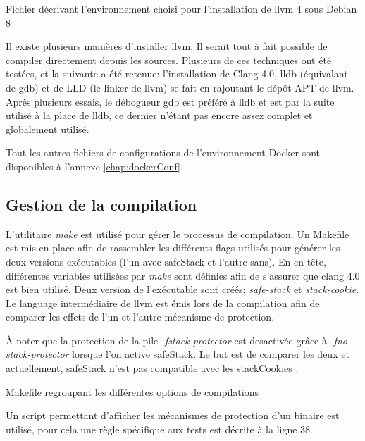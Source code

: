 \begin{listing}
	\caption{Fichier décrivant l'environnement choisi pour l'installation de \gls{llvm} 4 sous Debian 8}
	\label{lst:dockerfile}
\end{listing}

Il existe plusieurs manières d'installer \gls{llvm}. Il serait tout à fait possible de compiler directement depuis les sources. Plusieurs de ces techniques ont été testées, et la suivante a été retenue: l'installation de Clang 4.0, \gls{lldb} (équivalant de \gls{gdb}) et de LLD (le \og linker \fg de \gls{llvm}) se fait en rajoutant le dépôt APT de \gls{llvm}. Après plusieurs essais, le débogueur \gls{gdb} est préféré à \gls{lldb} et est par la suite utilisé à la place de \gls{lldb}, ce dernier n'étant pas encore assez complet et globalement utilisé.

Tout les autres fichiers de configurations de l'environnement Docker sont disponibles à l'annexe \ref{chap:dockerConf}.

\subsection{Gestion de la compilation}

L'utilitaire \textit{make} est utilisé pour gérer le processus de compilation. Un Makefile est mis en place afin de rassembler les différents \og flags \fg utilisés pour générer les deux versions exécutables (l'un avec \gls{safeStack} et l'autre sans). En en-tête, différentes variables utilisées par \textit{make} sont définies afin de s'assurer que \gls{clang} 4.0 est bien utilisé. Deux version de l'exécutable sont créés: \textit{safe-stack} et \textit{stack-cookie}. Le language intermédiaire de \gls{llvm} est émis lors de la compilation afin de comparer les effets de l'un et l'autre mécanisme de protection.

À noter que la protection de la pile \textit{-fstack-protector} est desactivée grâce à \textit{-fno-stack-protector} lorsque l'on active \gls{safeStack}. Le but est de comparer les deux et actuellement, \og \gls{safeStack} \fg n'est pas compatible avec les \og \gls{stackCookies} \fg.

\begin{listing}
	\caption{Makefile regroupant les différentes options de compilations}
	\label{lst:defaultMakefile}
\end{listing}

Un script permettant d'afficher les mécanismes de protection d'un binaire est utilisé, pour cela une règle spécifique aux tests est décrite à la ligne 38.

